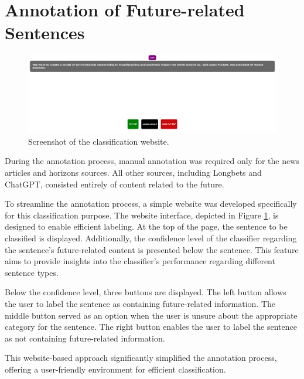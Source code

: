 \documentclass[12pt,oneside,bibtotoc,liststotoc]{scrbook}
\begin{document}
\section{Annotation of Future-related Sentences}
\begin{figure}[H]
  \centering
  \includegraphics[width=\linewidth]{img/classification_website.png}
  \caption{Screenshot of the classification website.}
  \label{fig:classification_website}
\end{figure}
During the annotation process, manual annotation was required only for the news articles and horizons sources. All other sources, including Longbets and ChatGPT, consisted entirely of content related to the future.

To streamline the annotation process, a simple website was developed specifically for this classification purpose. The website interface, depicted in Figure \ref{fig:classification_website}, is designed to enable efficient labeling. At the top of the page, the sentence to be classified is displayed. Additionally, the confidence level of the classifier regarding the sentence's future-related content is presented below the sentence. This feature aims to provide insights into the classifier's performance regarding different sentence types.

Below the confidence level, three buttons are displayed. The left button allows the user to label the sentence as containing future-related information. The middle button served as an option when the user is unsure about the appropriate category for the sentence. The right button enables the user to label the sentence as not containing future-related information.

This website-based approach significantly simplified the annotation process, offering a user-friendly environment for efficient classification.
\end{document}
